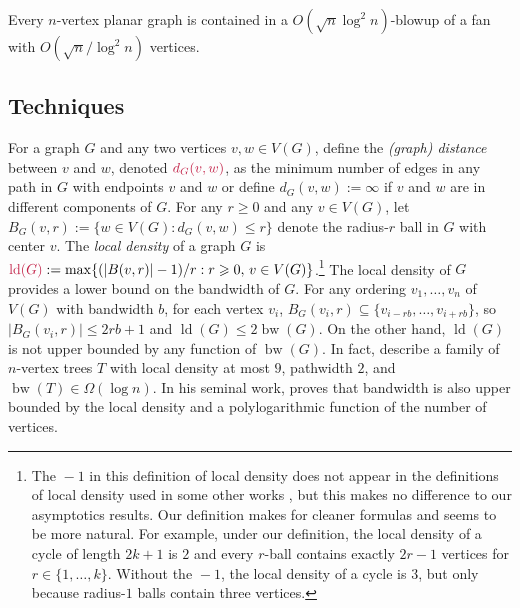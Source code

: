 \documentclass{patmorin}
\makeatletter
\renewcommand{\ge}{\geqslant}
\renewcommand{\le}{\leqslant}
\renewcommand{\leq}{\leqslant}
\newcommand{\defin}[1]{\emph{\textcolor{brightmaroon}{#1}}}
\def\mathcolor#1#{\@mathcolor{#1}}
\def\@mathcolor#1#2#3{%
  \protect\leavevmode
  \begingroup
    \color#1{#2}#3%
  \endgroup
}
\newcommand{\mathdefin}[1]{\mathcolor{brightmaroon}{#1}}
\DeclareMathOperator{\bw}{bw}
\DeclareMathOperator{\ld}{ld}
\makeatother
\begin{document}
\begin{thm}\label{main_thm_planar_order}
  Every $n$-vertex planar graph is contained in a $O(\sqrt{n}\log^2 n)$-blowup of a fan with 
  $O(\sqrt{n}/\log^2 n)$ vertices. 
\end{thm}

\subsection{Techniques}

For a graph $G$ and any two vertices $v,w\in V(G)$, define the \defin{(graph) distance} between $v$ and $w$, denoted $\mathdefin{d_G(v,w)}$, as the minimum number of edges in any path in $G$ with endpoints $v$ and $w$ or define $d_G(v,w):=\infty$ if $v$ and $w$ are in different components of $G$.  For any $r\ge 0$ and any $v\in V(G)$, let $B_G(v,r):=\{w\in V(G):d_G(v,w)\le r\}$ denote the radius-$r$ ball in $G$ with center $v$.
The \defin{local density} of a graph $G$ is $\mathdefin{\ld(G)}:=\max\{(|B(v,r)|-1)/r:r\ge 0,\, v\in V(G)\}$.\footnote{The ${}-1$ in this definition of local density does not appear in the definitions of local density used in some other works \cite{feige:approximating,rao:small}, but this makes no difference to our asymptotics results.  Our definition makes for cleaner formulas and seems to be more natural. For example, under our definition, the local density of a cycle of length $2k+1$ is $2$ and every $r$-ball contains exactly $2r-1$ vertices for $r\in\{1,\ldots,k\}$. Without the ${}-1$, the local density of a cycle is $3$, but only because radius-$1$ balls contain three vertices.} The local density of $G$ provides a lower bound on the bandwidth of $G$. For any ordering $v_1,\dots,v_n$ of $V(G)$ with bandwidth $b$, for each vertex $v_i$, $B_G(v_i,r) \subseteq \{v_{i-rb},\dots,v_{i+rb}\}$, so $|B_G(v_i,r)|\leq 2rb+1$ and $\ld(G)\leq 2\bw(G)$.
On the other hand, $\ld(G)$ is not upper bounded by any function of $\bw(G)$. In fact, \citet{CS89} describe a family of $n$-vertex trees $T$ with local density at most $9$, pathwidth $2$, and  $\bw(T)\in\Omega(\log n)$.
In his seminal work, \citet{feige:approximating} proves that bandwidth is also upper bounded by the local density and a polylogarithmic function of the number of vertices.
\end{document}
